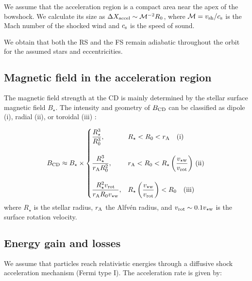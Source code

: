 \documentclass[baaa]{baaa}
\begin{document}
We assume that the acceleration region is a compact area near the apex of the bowshock. We calculate its size as $\Delta X_{\text{\rm accel}} \sim \mathcal{M}^{-2} R_0$, where $\mathcal{M}=  {v_{\text{\rm sh}}}/{c_{\rm s}}$ is the Mach number of the shocked wind and $c_{\rm s}$ is the speed of sound. 

We obtain that both the RS and the FS remain adiabatic throughout the orbit for the assumed stars and eccentricities.




\subsection{Magnetic field in the acceleration region}

The magnetic field strength at the CD is mainly determined by the stellar surface magnetic field \( B_\star \). The intensity and geometry of \( B_\text{\rm CD} \) can be classified as dipole (i), radial (ii), or toroidal (iii) \citep{1993ApJ...402..271E}:


\begin{align}
B_{\rm CD} \approx B_\star \times
\begin{cases}
\dfrac{R_\star^3}{R_0^3}, & R_\star < R_0 < r_{\rm A} \quad\text{(i)} \\[2em]
\dfrac{R_\star^3}{r_{\rm A} R_0^2}, & r_{\rm A} < R_0 < R_\star \left( \dfrac{v_{\star\rm w}}{v_{\rm rot}} \right) \text{\,(ii)} \\[2em]
\dfrac{R_\star^2 v_{\rm rot}}{r_{\rm A} R_0 v_{\star\rm w}}, & R_\star \left( \dfrac{v_{\star\rm w}}{v_{\rm rot}} \right) < R_0 \quad\text{(iii)}
\end{cases}
\end{align}
where $R_{\star}$ is the stellar radius, $r_{\rm A}$ the Alfvén radius, and $v_{\text{\rm rot}} \sim 0.1 v_{\star \rm w}$ is the surface rotation velocity.

\subsection{Energy gain and losses}\label{S_losses}
We assume that particles reach relativistic energies through a diffusive shock acceleration mechanism (Fermi type I). The acceleration rate is given by:
\end{document}
